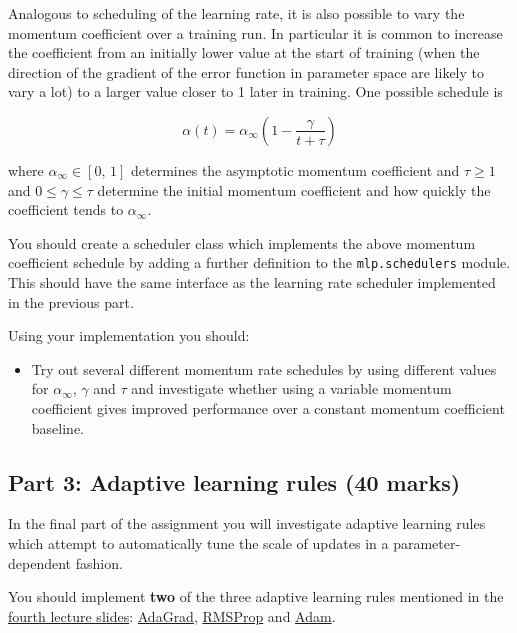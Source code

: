 \documentclass[11pt,]{article}
\begin{document}
Analogous to scheduling of the learning rate, it is also possible to
vary the momentum coefficient over a training run. In particular it is
common to increase the coefficient from an initially lower value at the
start of training (when the direction of the gradient of the error
function in parameter space are likely to vary a lot) to a larger value
closer to 1 later in training. One possible schedule is

\begin{equation}
   \alpha(t) = \alpha_{\infty} \left( 1 - \frac{\gamma}{t + \tau} \right)
\end{equation}

where $\alpha_{\infty} \in [0,\,1]$ determines the asymptotic momentum
coefficient and $\tau \geq 1$ and $0 \leq \gamma \leq \tau$ determine
the initial momentum coefficient and how quickly the coefficient tends to
$\alpha_{\infty}$.

You should create a scheduler class which implements the above momentum
coefficient schedule by adding a further definition to the
\texttt{mlp.schedulers} module. This should have the same interface as
the learning rate scheduler implemented in the previous part.

Using your implementation you should:

\begin{itemize}
\itemsep1pt\parskip0pt
\item
  Try out several different momentum rate schedules by using different 
  values for $\alpha_{\infty}$, $\gamma$ and $\tau$ and investigate whether 
  using a variable momentum coefficient gives improved performance over 
  a constant momentum coefficient baseline.
\end{itemize}

\subsection{Part 3: Adaptive learning rules (40
marks)}\label{part-3-adaptive-learning-rules-40-marks}

In the final part of the assignment you will investigate adaptive
learning rules which attempt to automatically tune the scale of updates
in a parameter-dependent fashion.

You should implement \textbf{two} of the three adaptive learning rules
mentioned in the
\href{http://www.inf.ed.ac.uk/teaching/courses/mlp/2016/mlp04-learn.pdf}{fourth
lecture slides}:
\href{http://jmlr.org/papers/v12/duchi11a.html}{AdaGrad},
\href{http://www.cs.toronto.edu/~tijmen/csc321/slides/lecture_slides_lec6.pdf}{RMSProp}
and \href{https://arxiv.org/abs/1412.6980}{Adam}.
\end{document}
